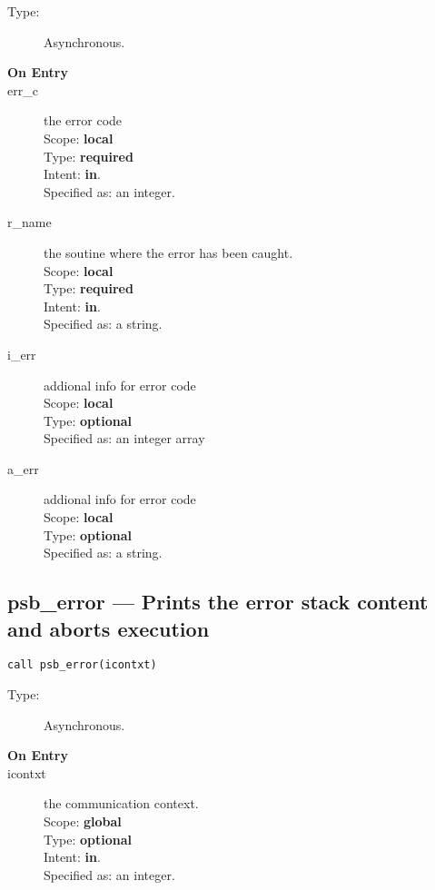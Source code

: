\begin{description}
\item[Type:] Asynchronous.
\item[\bf On Entry]
\item[err\_c] the error code\\
Scope: {\bf local} \\
Type: {\bf required}\\
Intent: {\bf in}.\\
Specified as: an integer.
\item[r\_name] the soutine where the error has been caught.\\
Scope: {\bf local} \\
Type: {\bf required}\\
Intent: {\bf in}.\\
Specified as: a string.\\
\item[i\_err] addional info for error code\\
Scope: {\bf local} \\
Type: {\bf optional}\\
Specified as: an integer array\\
\item[a\_err] addional info for error code\\
Scope: {\bf local} \\
Type: {\bf optional}\\
Specified as: a string.\\
\end{description}

\clearpage\subsection*{psb\_error --- Prints the error stack content and aborts
  execution}

\begin{verbatim}
call psb_error(icontxt)
\end{verbatim}

\begin{description}
\item[Type:] Asynchronous.
\item[\bf On Entry]
\item[icontxt] the communication context.\\
Scope: {\bf global} \\
Type: {\bf optional}\\
Intent: {\bf in}.\\
Specified as: an integer.
\end{description}




